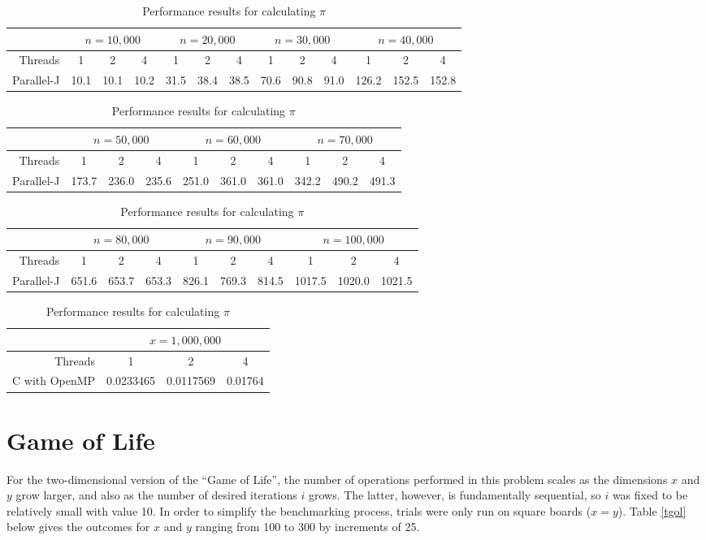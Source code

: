 \begin{table}[htbp]
\begin{tabular}{|r||c|c|c||c|c|c||c|c|c||c|c|c||}
	\hline
		& \multicolumn{3}{|c|}{$n=10,000$} & \multicolumn{3}{|c|}{$n=20,000$} & \multicolumn{3}{|c|}{$n=30,000$} & \multicolumn{3}{|c|}{$n=40,000$} \\
	\hline
		Threads & 1 & 2 & 4 & 1 & 2 & 4 & 1 & 2 & 4 & 1 & 2 & 4 \\
	\hline
	\hline
		Parallel-J & 10.1 & 10.1 & 10.2 & 31.5 & 38.4 & 38.5 & 70.6 & 90.8 & 91.0 & 126.2 & 152.5& 152.8 \\
	\hline
\end{tabular}

\begin{tabular}{|r|c|c|c||c|c|c||c|c|c||}
	\hline
		& \multicolumn{3}{|c||}{$n=50,000$} & \multicolumn{3}{|c|}{$n=60,000$} & \multicolumn{3}{|c|}{$n=70,000$} \\
	\hline
		Threads & 1 & 2 & 4 & 1 & 2 & 4 & 1 & 2 & 4 \\
	\hline
	\hline
		Parallel-J & 173.7 & 236.0 & 235.6 & 251.0 & 361.0 & 361.0 & 342.2 & 490.2 & 491.3 \\
	\hline
\end{tabular}

\begin{tabular}{|r|c|c|c||c|c|c||c|c|c||}
	\hline
		 & \multicolumn{3}{|c|}{$n=80,000$} & \multicolumn{3}{|c|}{$n=90,000$} & \multicolumn{3}{|c|}{$n=100,000$} \\
	\hline
		Threads & 1 & 2 & 4 & 1 & 2 & 4 & 1 & 2 & 4 \\
	\hline
	\hline
		Parallel-J & 651.6 & 653.7 & 653.3 & 826.1 & 769.3 & 814.5 & 1017.5 & 1020.0 & 1021.5 \\
	\hline
\end{tabular}
\begin{tabular}{|r|c|c|c||}
	\hline
		& \multicolumn{3}{|c|}{$x=1,000,000$} \\
	\hline
		Threads & 1 & 2 & 4 \\
	\hline
	\hline
		C with OpenMP & 0.0233465 & 0.0117569 & 0.01764 \\
	\hline
\end{tabular}
\caption{Performance results for calculating $\pi$}
\label{tnip}
\end{table}

\section{Game of Life}
For the two-dimensional version of the ``Game of Life'', 
the number of operations performed in this problem scales 
as the dimensions $x$ and $y$ grow larger, 
and also as the number of desired iterations $i$ grows. 
The latter, however, is fundamentally sequential, 
so $i$ was fixed to be relatively small with value 10.
In order to simplify the benchmarking process, 
trials were only run on square boards ($x=y$). 
Table \ref{tgol} below gives the outcomes for $x$ and $y$ 
ranging from 100 to 300 by increments of 25.

